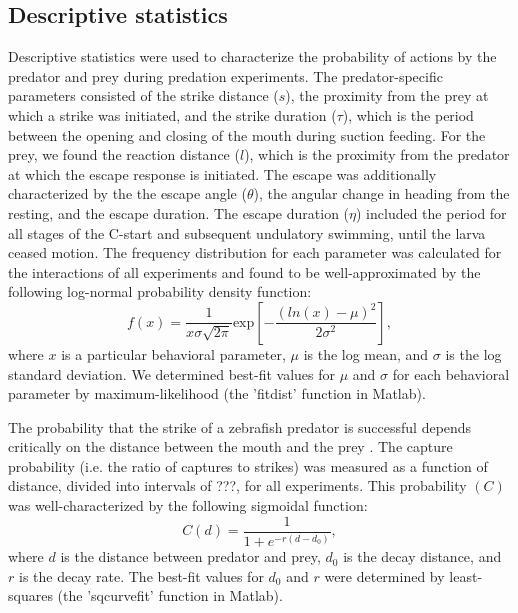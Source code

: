 \documentclass[]{rsos}%
\begin{document}
\subsection{Descriptive statistics}

Descriptive statistics were used to characterize the probability of actions by the predator and prey during predation experiments.
The predator-specific parameters consisted of the strike distance ($s$), the proximity from the prey at which a strike was initiated, and the strike duration ($\tau$), which is the period between the opening and closing of the mouth during suction feeding. 
For the prey, we found the reaction distance ($l$), which is the proximity from the predator at which the escape response is initiated.
The escape was additionally characterized by the the escape angle ($\theta$), the angular change in heading from the resting, and the escape duration.
The escape duration ($\eta$) included the period for all stages of the C-start and subsequent undulatory swimming, until the larva ceased motion.
The frequency distribution for each parameter was calculated for the interactions of all experiments and found to be well-approximated by the following log-normal probability density function:
%
\begin{equation}%
f(x) = \frac{1}{x\sigma \sqrt{2 \pi}} \text{exp} \left[ -{\frac{(ln(x)-\mu)^2}{2\sigma ^2}} \right],
\label{eqn_lognorm}
\end{equation}
%
where $x$ is a particular behavioral parameter, $\mu$ is the log mean, and $\sigma$ is the log standard deviation. 
We determined best-fit values for $\mu$ and $\sigma$ for each behavioral parameter by maximum-likelihood (the 'fitdist' function in Matlab).

The probability that the strike of a zebrafish predator is successful depends critically on the distance between the mouth and the prey \cite{Stewart:2013bha}.
The capture probability (i.e. the ratio of captures to strikes) was measured as a function of distance, divided into intervals of ???, for all experiments.
This probability $(C)$ was well-characterized by the following sigmoidal function:
%
\begin{equation}%
C(d) = \frac{1}{1+e^{-r(d-d_0)}},
\label{eqn_sig} 
\end{equation}
%
where $d$ is the distance between predator and prey, $d_0$ is the decay distance, and $r$ is the decay rate. 
The best-fit values for $d_0$ and $r$ were determined by least-squares (the 'sqcurvefit' function in Matlab).
\end{document}
